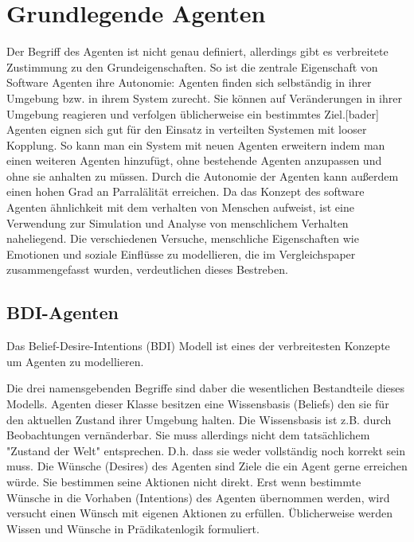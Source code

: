 

\chapter{Grundlegende Agenten}
Der Begriff des Agenten ist nicht genau definiert, allerdings gibt es verbreitete Zustimmung zu den Grundeigenschaften.
So ist die zentrale Eigenschaft von Software Agenten ihre Autonomie: Agenten finden sich selbständig in ihrer Umgebung bzw. in ihrem System zurecht. Sie können auf Veränderungen in ihrer Umgebung reagieren und verfolgen üblicherweise ein bestimmtes Ziel.[bader]%
Agenten eignen sich gut für den Einsatz in verteilten Systemen mit looser Kopplung.
So kann man ein System mit neuen Agenten erweitern indem man einen weiteren Agenten hinzufügt, ohne bestehende Agenten anzupassen und ohne sie anhalten zu müssen.
Durch die Autonomie der Agenten kann außerdem einen hohen Grad an Parralälität erreichen.
Da das Konzept des software Agenten ähnlichkeit mit dem verhalten von Menschen aufweist, ist eine Verwendung zur Simulation und Analyse von menschlichem Verhalten naheliegend.
Die verschiedenen Versuche, menschliche Eigenschaften wie Emotionen und soziale Einflüsse zu modellieren, die im Vergleichspaper zusammengefasst wurden, verdeutlichen dieses Bestreben.

\section{BDI-Agenten}
Das Belief-Desire-Intentions (BDI) Modell ist eines der verbreitesten Konzepte um Agenten zu modellieren.

Die drei namensgebenden Begriffe sind daber die wesentlichen Bestandteile dieses Modells.
Agenten dieser Klasse besitzen eine Wissensbasis (Beliefs) den sie für den aktuellen Zustand ihrer Umgebung halten.
Die Wissensbasis ist z.B. durch Beobachtungen vernänderbar.
Sie muss allerdings nicht dem tatsächlichem "Zustand der Welt" entsprechen.
D.h. dass sie weder vollständig noch korrekt sein muss.
Die Wünsche (Desires) des Agenten sind Ziele die ein Agent gerne erreichen würde.
Sie bestimmen seine Aktionen nicht direkt. 
Erst wenn bestimmte Wünsche in die Vorhaben (Intentions) des Agenten übernommen werden, wird versucht einen Wünsch mit eigenen Aktionen zu erfüllen.
Üblicherweise werden Wissen und Wünsche in Prädikatenlogik formuliert.


